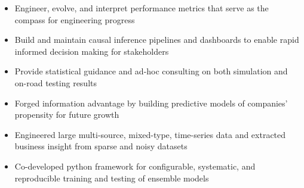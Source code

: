 \documentclass[10.95pt,letterpaper]{altacv}
\newlength{\comlogowidth}
\newcommand{\companylogo}[1]{%
	\savebox{\comlogobox}{\texttt{[image: \#1]}}%
	\settowidth{\comlogowidth}{\usebox{\comlogobox}}
}
\newcommand{\makelogospace}{\hspace*{\comlogowidth}\enspace}
\newcommand{\usecompanylogo}{\raisebox{0pt}[1em]{\usebox{\comlogobox}}\enspace}
\begin{document}
	
	\begin{fullwidth}
		\makecvheader
	\end{fullwidth}
	
	
	\begin{itemize}
		\item Engineer, evolve, and interpret performance metrics that serve as the compass for engineering progress
		\item Build and maintain causal inference pipelines and dashboards to enable rapid informed decision making for stakeholders
		\item Provide statistical guidance and ad-hoc consulting on both simulation and on-road testing results
	\end{itemize}
	\divider	
	
	\begin{itemize}
		\item Forged information advantage by building predictive models of companies' propensity for future growth
		\item Engineered large multi-source, mixed-type, time-series data and extracted business insight from sparse and noisy datasets
		\item Co-developed python framework for configurable, systematic, and reproducible training and testing of ensemble models
	\end{itemize}
	\divider	
	
\end{document}
